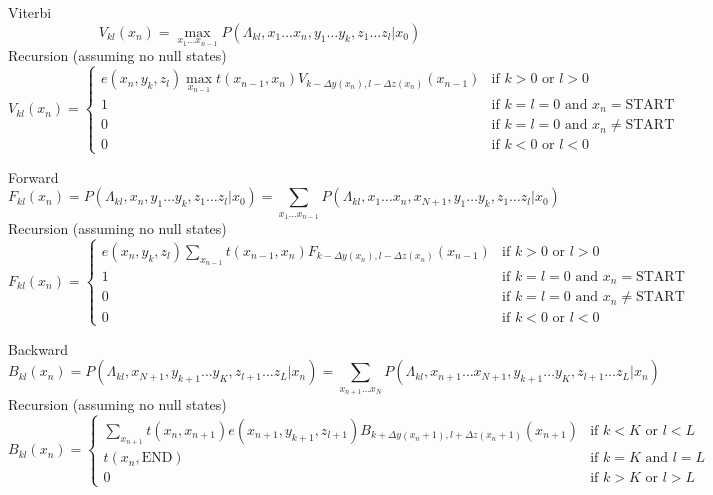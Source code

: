 \documentclass{beamer}
\begin{document}
\begin{frame}{}

\itemb
\item Viterbi
\[
V_{kl}(x_n) = \max_{x_1 \ldots x_{n-1}}
P \left( \Lambda_{kl},x_1 \ldots x_n,y_1 \ldots y_k,z_1 \ldots z_l | x_0 \right)
\]
Recursion (assuming no null states)
\[
V_{kl}(x_n) = \left\{ \begin{array}{ll} \displaystyle
e(x_n,y_k,z_l) \max_{x_{n-1}} t(x_{n-1},x_n)
V_{k-\Delta y(x_n),l-\Delta z(x_n)}(x_{n-1}) & \mbox{if $k > 0$ or $l > 0$} \\
1 & \mbox{if $k=l=0$ and $x_n=$START} \\
0 & \mbox{if $k=l=0$ and $x_n\neq$START} \\
0 & \mbox{if $k < 0$ or $l < 0$}
\end{array} \right.
\]
\iteme

\end{frame}

\begin{frame}{}

\itemb
\item Forward
\[
F_{kl}(x_n)
= P \left( \Lambda_{kl},x_n,y_1 \ldots y_k,z_1 \ldots z_l | x_0 \right)
= \sum_{x_1 \ldots x_{n-1}}
P \left( \Lambda_{kl},x_1 \ldots x_n,x_{N+1},y_1 \ldots y_k,z_1 \ldots z_l | x_0 \right)
\]
Recursion (assuming no null states)
\[
F_{kl}(x_n) = \left\{ \begin{array}{ll} \displaystyle
e(x_n,y_k,z_l) \sum_{x_{n-1}} t(x_{n-1},x_n)
F_{k-\Delta y(x_n),l-\Delta z(x_n)}(x_{n-1}) & \mbox{if $k > 0$ or $l > 0$} \\
1 & \mbox{if $k=l=0$ and $x_n=$START} \\
0 & \mbox{if $k=l=0$ and $x_n\neq$START} \\
0 & \mbox{if $k < 0$ or $l < 0$}
\end{array} \right.
\]
\iteme

\end{frame}

\begin{frame}{}

\itemb
\item Backward
\[
B_{kl}(x_n)
= P \left( \Lambda_{kl},x_{N+1},y_{k+1} \ldots y_K,z_{l+1} \ldots z_L | x_n \right)
= \sum_{x_{n+1} \ldots x_N}
P \left( \Lambda_{kl},x_{n+1} \ldots x_{N+1},y_{k+1} \ldots y_K,z_{l+1} \ldots z_L | x_n \right)
\]
Recursion (assuming no null states)
\[
B_{kl}(x_n) = \left\{ \begin{array}{ll} \displaystyle
\sum_{x_{n+1}}
t(x_n,x_{n+1})
e(x_{n+1},y_{k+1},z_{l+1})
B_{k+\Delta y(x_n+1),l+\Delta z(x_n+1)}(x_{n+1}) & \mbox{if $k < K$ or $l < L$} \\
t(x_n,\mbox{END}) & \mbox{if $k=K$ and $l=L$} \\
0 & \mbox{if $k > K$ or $l > L$}
\end{array} \right.
\]
\iteme

\end{frame}
\end{document}
